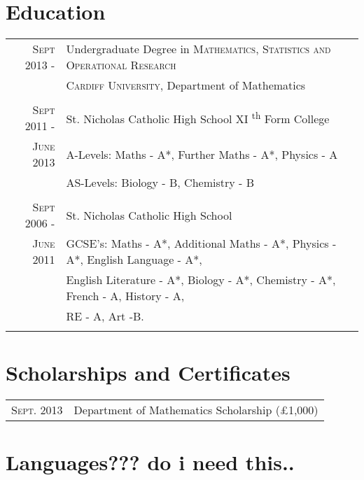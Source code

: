 \documentclass[a4paper, 11pt]{article}
\begin{document}
{\begin{tabular}{r|p{11cm}}
\end{tabular}
\section{Education}
\begin{tabular}{rl}

\textsc{Sept} 2013 - & Undergraduate Degree in \textsc{Mathematics, Statistics and Operational Research} \\
&\normalsize \textsc{Cardiff University}, Department of Mathematics\\
\\
\textsc{Sept} 2011 - & St. Nicholas Catholic High School XI \textsuperscript{th} Form College\\
\textsc{June} 2013 & A-Levels: Maths - A*, Further Maths - A*, Physics - A\\
& AS-Levels: Biology - B, Chemistry - B\\
\\
\textsc{Sept} 2006 - & St. Nicholas Catholic High School\\
\textsc{June} 2011 & GCSE's: Maths - A*, Additional Maths - A*, Physics - A*, English Language - A*,\\
& English Literature - A*, Biology - A*, Chemistry - A*, French - A, History - A,\\
& RE - A, Art -B.\\
\\

\end{tabular}
\section{Scholarships and Certificates}
\begin{tabular}{rl}

\textsc{Sept.} 2013 & Department of Mathematics Scholarship (\pounds1,000)\\

\end{tabular}
\section{Languages??? do i need this..}
\begin{tabular}{rl}


\end{tabular}}
\end{document}
